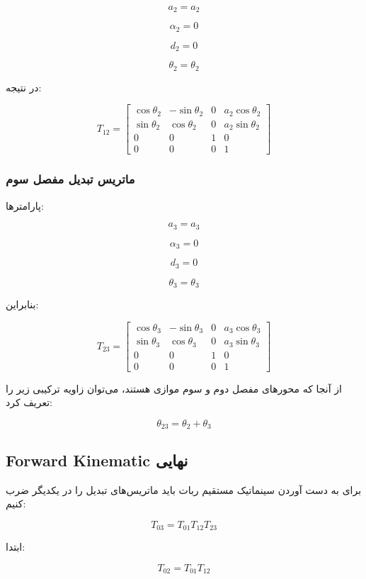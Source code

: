 \documentclass{article}
\begin{document}
\[
a_2 = a_2
\]

\[
\alpha_2 = 0
\]

\[
d_2 = 0
\]

\[
\theta_2 = \theta_2
\]

در نتیجه:

\[
T_{12} =
\left[
\begin{array}{ccc|c}
	\cos\theta_2 & -\sin\theta_2 & 0 & a_2\cos\theta_2 \\
	\sin\theta_2 & \cos\theta_2 & 0 & a_2\sin\theta_2 \\
	0 & 0 & 1 & 0 \\
	\hline
	0 & 0 & 0 & 1
\end{array}
\right]
\]

\subsubsection{ماتریس تبدیل مفصل سوم}

پارامترها:

\[
a_3 = a_3
\]

\[
\alpha_3 = 0
\]

\[
d_3 = 0
\]

\[
\theta_3 = \theta_3
\]

بنابراین:

\[
T_{23} =
\left[
\begin{array}{ccc|c}
	\cos\theta_3 & -\sin\theta_3 & 0 & a_3\cos\theta_3 \\
	\sin\theta_3 & \cos\theta_3 & 0 & a_3\sin\theta_3 \\
	0 & 0 & 1 & 0 \\
	\hline
	0 & 0 & 0 & 1
\end{array}
\right]
\]

از آنجا که محورهای مفصل دوم و سوم موازی هستند، می‌توان زاویه ترکیبی زیر را تعریف کرد:

\[
\theta_{23} = \theta_2 + \theta_3
\]

\subsection{Forward Kinematic نهایی}

برای به دست آوردن سینماتیک مستقیم ربات باید ماتریس‌های تبدیل را در
یکدیگر ضرب کنیم:

\[
T_{03} =
T_{01} T_{12} T_{23}
\]

ابتدا:

\[
T_{02}=T_{01}T_{12}
\]
\end{document}
